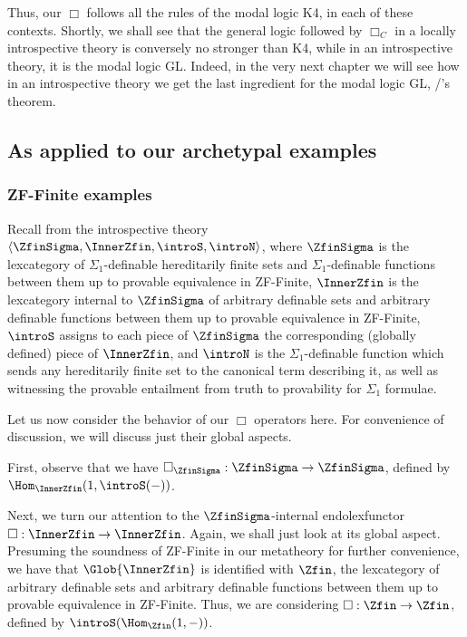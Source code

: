 Thus, our $\Box$ follows all the rules of the modal logic K4, in each of these contexts. Shortly, we shall see that the general logic followed by $\Box_C$ in a locally introspective theory is conversely no stronger than K4, while in an introspective theory, it is the modal logic GL. Indeed, in the very next chapter we will see how in an introspective theory we get the last ingredient for the modal logic GL, \Loeb/'s theorem.



\subsection{As applied to our archetypal examples}

\subsubsection{ZF-Finite examples}
\TODO

Recall from  the introspective theory $\langle \ZfinSigma, \InnerZfin, \introS, \introN \rangle$, where $\ZfinSigma$ is the lexcategory of $\Sigma_1$-definable hereditarily finite sets and $\Sigma_1$-definable functions between them up to provable equivalence in ZF-Finite, $\InnerZfin$ is the lexcategory internal to $\ZfinSigma$ of arbitrary definable sets and arbitrary definable functions between them up to provable equivalence in ZF-Finite, $\introS$ assigns to each piece of $\ZfinSigma$ the corresponding (globally defined) piece of $\InnerZfin$, and $\introN$ is the $\Sigma_1$-definable function which sends any hereditarily finite set to the canonical term describing it, as well as witnessing the provable entailment from truth to provability for $\Sigma_1$ formulae.

Let us now consider the behavior of our $\Box$ operators here. For convenience of discussion, we will discuss just their global aspects.

First, observe that we have $\Box_{\ZfinSigma} : \ZfinSigma \to \ZfinSigma$, defined by $\Hom_{\InnerZfin}(1, \introS(-))$. \TODO

Next, we turn our attention to the $\ZfinSigma$-internal endolexfunctor $\Box : \InnerZfin \to \InnerZfin$. Again, we shall just look at its global aspect. Presuming the soundness of ZF-Finite in our metatheory for further convenience, we have that $\Glob{\InnerZfin}$ is identified with $\Zfin$, the lexcategory of arbitrary definable sets and arbitrary definable functions between them up to provable equivalence in ZF-Finite. Thus, we are considering $\Box : \Zfin \to \Zfin$, defined by $\introS(\Hom_{\Zfin}(1, -))$. \TODO

